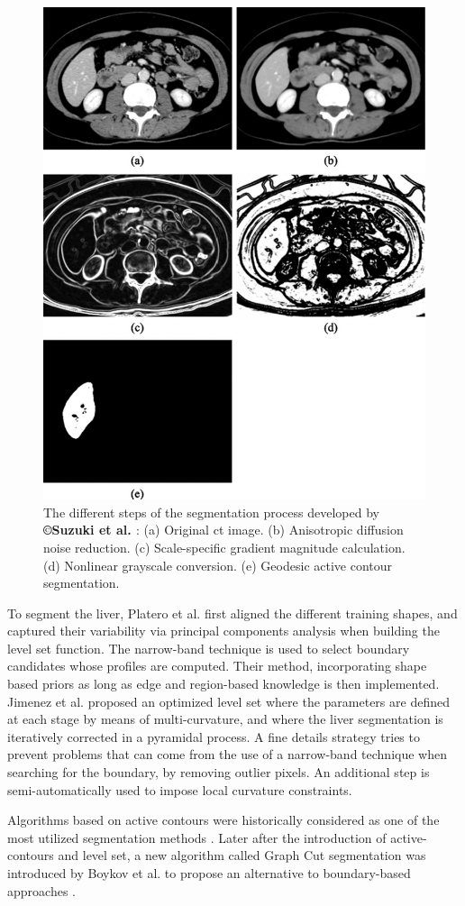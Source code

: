 \begin{figure}[ht!]
	\centering
	\includegraphics[width=0.5\linewidth]{images/Suzuki2010_Fig3}
	\caption{The different steps of the segmentation process developed by \textbf{©Suzuki et al. \cite{Suzuki2010}}: (a) Original \ac{ct} image. (b) Anisotropic diffusion noise reduction. (c) Scale-specific gradient magnitude calculation. (d) Nonlinear grayscale conversion. (e) Geodesic active contour segmentation.}
	\label{Suzuki2010_Fig3}
\end{figure}


To segment the liver, Platero et al. \cite{Platero2011} first aligned the different training shapes, and captured
their variability via principal components analysis when building the
level set function. The narrow-band technique is used to select boundary
candidates whose profiles are computed. Their method, incorporating
shape based priors as long as edge and region-based knowledge is then
implemented.
Jimenez et al. \cite{Jimenez-Carretero2011} proposed an optimized level set where the parameters are
defined at each stage by means of multi-curvature, and where the liver
segmentation is iteratively corrected in a pyramidal process. A fine
details strategy tries to prevent problems that can come from the use of
a narrow-band technique when searching for the boundary, by removing
outlier pixels. An additional step is semi-automatically used to impose
local curvature constraints.

Algorithms based on active contours were historically considered as one
of the most utilized segmentation methods \cite{Moghbel2018}. Later after the introduction
of active-contours and level set, a new algorithm called Graph Cut
segmentation was introduced by Boykov et al. to propose an alternative to boundary-based approaches \cite{Boykov2001}.

